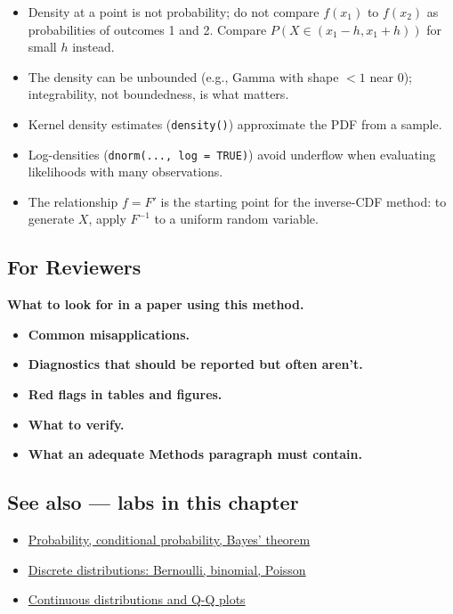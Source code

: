 \documentclass[
]{article}
\providecommand{\tightlist}{%
  \setlength{\itemsep}{0pt}\setlength{\parskip}{0pt}}
\begin{document}
\begin{itemize}
\tightlist
\item
  Density at a point is not probability; do not compare \(f(x_1)\) to
  \(f(x_2)\) as probabilities of outcomes 1 and 2. Compare
  \(P(X \in (x_1 - h, x_1 + h))\) for small \(h\) instead.
\item
  The density can be unbounded (e.g., Gamma with shape \(< 1\) near
  \(0\)); integrability, not boundedness, is what matters.
\item
  Kernel density estimates (\texttt{density()}) approximate the PDF from
  a sample.
\item
  Log-densities (\texttt{dnorm(...,\ log\ =\ TRUE)}) avoid underflow
  when evaluating likelihoods with many observations.
\item
  The relationship \(f = F'\) is the starting point for the inverse-CDF
  method: to generate \(X\), apply \(F^{-1}\) to a uniform random
  variable.
\end{itemize}

\subsection{For Reviewers}\label{for-reviewers}

\textbf{What to look for in a paper using this method.}

\begin{itemize}
\tightlist
\item
  \textbf{Common misapplications.}
\item
  \textbf{Diagnostics that should be reported but often aren't.}
\item
  \textbf{Red flags in tables and figures.}
\item
  \textbf{What to verify.}
\item
  \textbf{What an adequate Methods paragraph must contain.}
\end{itemize}

\subsection{See also --- labs in this
chapter}\label{see-also-labs-in-this-chapter}

\begin{itemize}
\tightlist
\item
  \href{labs/lab-probability-conditional-probability-bayes-theorem.Rmd}{Probability,
  conditional probability, Bayes' theorem}
\item
  \href{labs/lab-discrete-distributions-bernoulli-binomial-poisson.Rmd}{Discrete
  distributions: Bernoulli, binomial, Poisson}
\item
  \href{labs/lab-continuous-distributions-and-q-q-plots.Rmd}{Continuous
  distributions and Q-Q plots}
\end{itemize}
\end{document}

